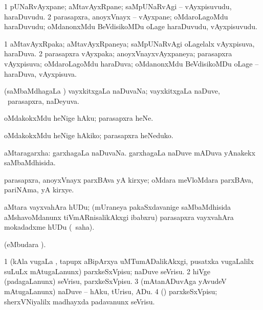 \bentry
{}
\gl{\nA}
\bmng
\bnum
\num{1} pUNaRvAyxpane; aMtavAyxRpane; saMpUNaRvAgi -- vAyxpisuvudu, haraDuvudu. 
\num{2} parasapxra, anoyxVnayx -- vAyxpane; oMdaroLagoMdu haraDuvudu; oMdanonxMdu BeVdisikoMDu oLage haraDuvudu, vAyxpisuvudu. 
\enum
\emng
\eentry

\bentry
{}
\gl{\gu}
\bmng
\bnum
\num{1} aMtavAyxRpaka; aMtavAyxRpaneya; saMpUNaRvAgi oLagelalx vAyxpisuva, haraDuva. 
\num{2} parasapxra vAyxpaka; anoyxVnayxvAyxpaneya; parasapxra vAyxpisuva; oMdaroLagoMdu haraDuva; oMdanonxMdu BeVdisikoMDu oLage -- haraDuva, vAyxpisuva. 
\enum
\emng
\eentry

\bentry
{}
\gl{\gu}
\bmng
(saMbaMdhagaLa \vi) vayxkitxgaLa naDuvaNa; vayxkitxgaLa naDuve, \kanmu\ parasapxra, naDeyuva. 
\emng
\eentry

\bentry
{}
\gl{\sakirx}
\bmng
oMdakokxMdu heNige hAku; parasapxra heNe. 
\emng

\noindent 
\gl{\akirx}
\bmng
oMdakokxMdu heNige hAkiko; parasapxra heNeduko. 
\emng
\eentry

\bentry
{}
\gl{\gu}
\bmng
aMtaragarxha: 
\banum
{} garxhagaLa naDuvaNa. 
 garxhagaLa naDuve mADuva yAnakekx saMbaMdhisida. 
\eanum
\emng
\eentry

\bentry
{}
\gl{\nA}
\bmng
parasapxra, anoyxVnayx parxBAva yA kirxye; oMdara meVloMdara parxBAva, pariNAma, yA kirxye. 
\emng
\eentry

\bentry
{}
\gl{\akirx}
\bmng
aMtara vayxvahAra hUDu; (mUraneya pakaSxdavanige saMbaMdhisida aMshavoMdanunx tiVmARnisalikAkxgi ibabxru) parasapxra vayxvahAra mokadadxme hUDu (\sakirx\ saha). 
\emng
\eentry

\bentry
{}
\gl{\nA}
\bmng
{} (eMbudara \saMkiSx). 
\emng
\eentry

\bentry
{}
\gl{\sakirx}
\bmng
\bnum
\num{1} (kAla \mo vugaLa \vi, tapupx aBipArxya uMTumADalikAkxgi, pusatxka \mo vugaLalilx suLuLx mAtugaLanunx) parxkeSxVpisu; naDuve seVrisu. 
\num{2} hiVge (padagaLanunx) seVrisu, parxkeSxVpisu. 
\num{3} (mAtanADuvAga yAvudeV mAtugaLanunx) naDuve -- hAku, tUrisu, ADu. 
\num{4} (\ga) parxkeSxVpisu; sherxVNiyalilx madhayxda padavanunx seVrisu. 
\enum
\emng
\eentry

